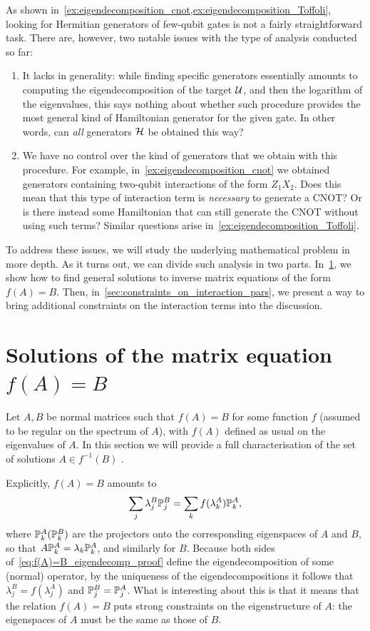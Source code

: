 As shown in~\cref{ex:eigendecomposition_cnot,ex:eigendecomposition_Toffoli}, looking for Hermitian generators of few-qubit gates is not a fairly straightforward task. There are, however, two notable issues with the type of analysis conducted so far:
\begin{enumerate}
    \item It lacks in generality: while finding specific generators essentially amounts to computing the eigendecomposition of the target $\mathcal{U}$, and then the logarithm of the eigenvalues, this says nothing about whether such procedure provides the most general kind of Hamiltonian generator for the given gate. In other words, can \textit{all} generators $\mathcal{H}$ be obtained this way?
    \item We have no control over the kind of generators that we obtain with this procedure. For example, in~\cref{ex:eigendecomposition_cnot} we obtained generators containing two-qubit interactions of the form $Z_1 X_2$. Does this mean that this type of interaction term is \textit{necessary} to generate a CNOT? Or is there instead some Hamiltonian that can still generate the CNOT without using such terms?
    Similar questions arise in~\cref{ex:eigendecomposition_Toffoli}.
\end{enumerate}
To address these issues, we will study the underlying mathematical problem in more depth. As it turns out, we can divide such analysis in two parts. In~\cref{sec:solutions_matrix_equation_f(A)=B}, we show how to find general solutions to inverse matrix equations of the form $f(A)=B$. Then, in~\cref{sec:constraints_on_interaction_pars}, we present a way to bring additional constraints on the interaction terms into the discussion.

\section{Solutions of the matrix equation \texorpdfstring{$f(A)=B$}{f(A)=B}}
\label{sec:solutions_matrix_equation_f(A)=B}
Let $A,B$ be normal matrices such that $f(A)=B$ for some function $f$ (assumed to be regular on the spectrum of $A$), with $f(A)$ defined as usual on the eigenvalues of $A$.
In this section we will provide a full characterisation of the set of solutions $A\in f^{-1}(B)$ .

Explicitly, $f(A)=B$ amounts to
\begin{equation}
    \sum_j \lambda_j^B \mathbb{P}_j^B = \sum_k f(\lambda_k^A) \mathbb{P}_k^A,
    \label{eq:f(A)=B_eigendecomp_proof}
\end{equation}
where $\mathbb{P}_k^{A} (\mathbb{P}_k^{B})$ are the projectors onto the corresponding eigenspaces of $A$ and $B$, so that
$A\mathbb{P}_k^A=\lambda_k \mathbb{P}_k^A$, and similarly for $B$.
Because both sides of~\cref{eq:f(A)=B_eigendecomp_proof} define the eigendecomposition of some (normal) operator, by the uniqueness of the eigendecompositions it follows that $\lambda_j^B=f(\lambda_j^A)$ and $\mathbb{P}_j^B=\mathbb{P}_j^A$.
What is interesting about this is that it means that the relation $f(A)=B$ puts strong constraints on the eigenstructure of $A$: the eigenspaces of $A$ must be the same as those of $B$.

